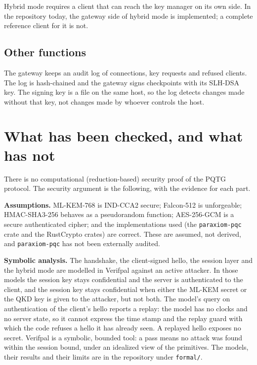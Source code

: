 \documentclass[11pt,letterpaper]{article}
\begin{document}
Hybrid mode requires a client that can reach the key manager on its own side. In the repository today, the gateway side of hybrid mode is implemented; a complete reference client for it is not.

\subsection{Other functions}

The gateway keeps an audit log of connections, key requests and refused clients. The log is hash-chained and the gateway signs checkpoints with its SLH-DSA key. The signing key is a file on the same host, so the log detects changes made without that key, not changes made by whoever controls the host.

\section{What has been checked, and what has not}
\label{sec:evidence}

There is no computational (reduction-based) security proof of the PQTG protocol. The security argument is the following, with the evidence for each part.

\textbf{Assumptions.} ML-KEM-768 is IND-CCA2 secure; Falcon-512 is unforgeable; HMAC-SHA3-256 behaves as a pseudorandom function; AES-256-GCM is a secure authenticated cipher; and the implementations used (the \texttt{paraxiom-pqc} crate and the RustCrypto crates) are correct. These are assumed, not derived, and \texttt{paraxiom-pqc} has not been externally audited.

\textbf{Symbolic analysis.} The handshake, the client-signed hello, the session layer and the hybrid mode are modelled in Verifpal against an active attacker. In those models the session key stays confidential and the server is authenticated to the client, and the session key stays confidential when either the ML-KEM secret or the QKD key is given to the attacker, but not both. The model's query on authentication of the client's hello reports a replay: the model has no clocks and no server state, so it cannot express the time stamp and the replay guard with which the code refuses a hello it has already seen. A replayed hello exposes no secret. Verifpal is a symbolic, bounded tool: a pass means no attack was found within the session bound, under an idealized view of the primitives. The models, their results and their limits are in the repository under \texttt{formal/}.
\end{document}
